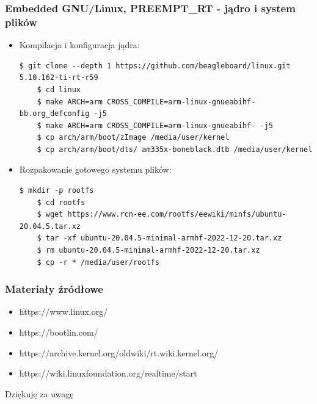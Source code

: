 \documentclass{beamer}
\begin{document}
\begin{frame}[fragile]
\frametitle{Embedded GNU/Linux, PREEMPT\_RT - jądro i system plików}
\begin{itemize}
\item Kompilacja i konfiguracja jądra:
\begin{lstlisting}[basicstyle=\tiny]
    $ git clone --depth 1 https://github.com/beagleboard/linux.git 5.10.162-ti-rt-r59
    $ cd linux
    $ make ARCH=arm CROSS_COMPILE=arm-linux-gnueabihf- bb.org_defconfig -j5
    $ make ARCH=arm CROSS_COMPILE=arm-linux-gnueabihf- -j5
    $ cp arch/arm/boot/zImage /media/user/kernel
    $ cp arch/arm/boot/dts/ am335x-boneblack.dtb /media/user/kernel
\end{lstlisting}
\item Rozpakowanie gotowego systemu plików:
\begin{lstlisting}[basicstyle=\tiny]
    $ mkdir -p rootfs
    $ cd rootfs
    $ wget https://www.rcn-ee.com/rootfs/eewiki/minfs/ubuntu-20.04.5.tar.xz
    $ tar -xf ubuntu-20.04.5-minimal-armhf-2022-12-20.tar.xz
    $ rm ubuntu-20.04.5-minimal-armhf-2022-12-20.tar.xz
    $ cp -r * /media/user/rootfs
\end{lstlisting}
\end{itemize}
\end{frame}

\begin{frame}
\frametitle{Materiały źródłowe}
    \begin{itemize}
        \item https://www.linux.org/
        \item https://bootlin.com/
        \item https://archive.kernel.org/oldwiki/rt.wiki.kernel.org/
        \item https://wiki.linuxfoundation.org/realtime/start
    \end{itemize}
\vfill
    \large{Dziękuję za uwagę}
\end{frame}
\end{document}
